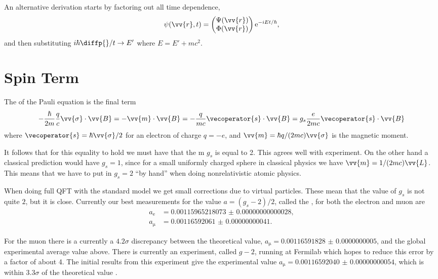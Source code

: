 \documentclass[fleqn]{NotesClass}
\newcommand*{\e}{\mathrm{e}}
\begin{document}
    An alternative derivation starts by factoring out all time dependence,
    \begin{equation}
        \psi(\vv{r}, t) = 
        \begin{pmatrix}
            \Psi(\vv{r})\\ \Phi(\vv{r})
        \end{pmatrix}
        \e^{-iEt/\hbar},
    \end{equation}
    and then substituting \(i\hbar\diffp{}/{t} \to E'\) where \(E = E' + mc^2\).
    
    \section{Spin Term}
    The  of the Pauli equation is the final term
    \begin{equation}
        -\frac{\hbar}{2m}\frac{q}{c} \vv{\sigma} \cdot \vv{B} = -\vv{m}\cdot\vv{B} = -\frac{q}{mc}\vecoperator{s}\cdot\vv{B} = g_{s}\frac{e}{2mc}\vecoperator{s}\cdot\vv{B}
    \end{equation}
    where \(\vecoperator{s} = \hbar\vv{\sigma}/2\) for an electron of charge \(q = -e\), and \(\vv{m} = \hbar q/(2mc)\vv{\sigma}\) is the magnetic moment.
    
    It follows that for this equality to hold we must have that the m \(g_s\) is equal to 2.
    This agrees well with experiment.
    On the other hand a classical prediction would have \(g_s = 1\), since for a small uniformly charged sphere in classical physics we have \(\vv{m} = 1/(2mc)\vv{L}\).
    This means that we have to put in \(g_s = 2\) \enquote{by hand} when doing nonrelativistic atomic physics.
    
    When doing full QFT with the standard model we get small corrections due to virtual particles.
    These mean that the value of \(g_s\) is not quite \(2\), but it is close.
    Currently our best measurements for the value \(a = (g_s - 2)/2\), called the , for both the electron and muon are
    \begin{align}
        a_{\mathrm{e}} &= \num{0.00115965218073(28)},\\
        a_{\upmu} &= \num{0.00116592061(41)}.
    \end{align}
    
    For the muon there is a currently a \(4.2\sigma\) discrepancy between the theoretical value, \(a_{\upmu} = \num{0.00116591828(50)}\), and the global experimental average value above.
    There is currently an experiment, called \(g - 2\), running at Fermilab which hopes to reduce this error by a factor of about 4.
    The initial results from this experiment give the experimental value \(a_{\upmu} = \num{0.00116592040(54)}\), which is within \(3.3\sigma\) of the theoretical value \cite{g-2}.
    
\end{document}

